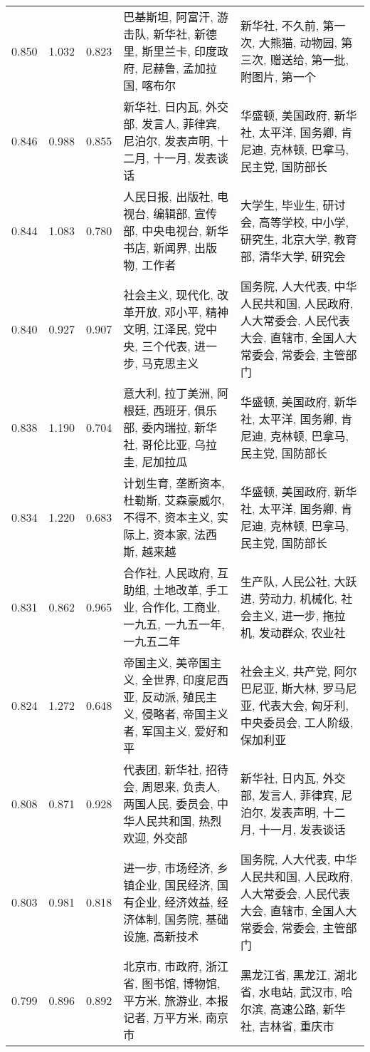 \begin{tabular}{cccp{5cm}p{5cm}}
0.850 & 1.032 & 0.823 & 巴基斯坦, 阿富汗, 游击队, 新华社, 新德里, 斯里兰卡, 印度政府, 尼赫鲁, 孟加拉国, 喀布尔 & 新华社, 不久前, 第一次, 大熊猫, 动物园, 第三次, 赠送给, 第一批, 附图片, 第一个 \\
0.846 & 0.988 & 0.855 & 新华社, 日内瓦, 外交部, 发言人, 菲律宾, 尼泊尔, 发表声明, 十二月, 十一月, 发表谈话 & 华盛顿, 美国政府, 新华社, 太平洋, 国务卿, 肯尼迪, 克林顿, 巴拿马, 民主党, 国防部长 \\
0.844 & 1.083 & 0.780 & 人民日报, 出版社, 电视台, 编辑部, 宣传部, 中央电视台, 新华书店, 新闻界, 出版物, 工作者 & 大学生, 毕业生, 研讨会, 高等学校, 中小学, 研究生, 北京大学, 教育部, 清华大学, 研究会 \\
0.840 & 0.927 & 0.907 & 社会主义, 现代化, 改革开放, 邓小平, 精神文明, 江泽民, 党中央, 三个代表, 进一步, 马克思主义 & 国务院, 人大代表, 中华人民共和国, 人民政府, 人大常委会, 人民代表大会, 直辖市, 全国人大常委会, 常委会, 主管部门 \\
0.838 & 1.190 & 0.704 & 意大利, 拉丁美洲, 阿根廷, 西班牙, 俱乐部, 委内瑞拉, 新华社, 哥伦比亚, 乌拉圭, 尼加拉瓜 & 华盛顿, 美国政府, 新华社, 太平洋, 国务卿, 肯尼迪, 克林顿, 巴拿马, 民主党, 国防部长 \\
0.834 & 1.220 & 0.683 & 计划生育, 垄断资本, 杜勒斯, 艾森豪威尔, 不得不, 资本主义, 实际上, 资本家, 法西斯, 越来越 & 华盛顿, 美国政府, 新华社, 太平洋, 国务卿, 肯尼迪, 克林顿, 巴拿马, 民主党, 国防部长 \\
0.831 & 0.862 & 0.965 & 合作社, 人民政府, 互助组, 土地改革, 手工业, 合作化, 工商业, 一九五, 一九五一年, 一九五二年 & 生产队, 人民公社, 大跃进, 劳动力, 机械化, 社会主义, 进一步, 拖拉机, 发动群众, 农业社 \\
0.824 & 1.272 & 0.648 & 帝国主义, 美帝国主义, 全世界, 印度尼西亚, 反动派, 殖民主义, 侵略者, 帝国主义者, 军国主义, 爱好和平 & 社会主义, 共产党, 阿尔巴尼亚, 斯大林, 罗马尼亚, 代表大会, 匈牙利, 中央委员会, 工人阶级, 保加利亚 \\
0.808 & 0.871 & 0.928 & 代表团, 新华社, 招待会, 周恩来, 负责人, 两国人民, 委员会, 中华人民共和国, 热烈欢迎, 外交部 & 新华社, 日内瓦, 外交部, 发言人, 菲律宾, 尼泊尔, 发表声明, 十二月, 十一月, 发表谈话 \\
0.803 & 0.981 & 0.818 & 进一步, 市场经济, 乡镇企业, 国民经济, 国有企业, 经济效益, 经济体制, 国务院, 基础设施, 高新技术 & 国务院, 人大代表, 中华人民共和国, 人民政府, 人大常委会, 人民代表大会, 直辖市, 全国人大常委会, 常委会, 主管部门 \\
0.799 & 0.896 & 0.892 & 北京市, 市政府, 浙江省, 图书馆, 博物馆, 平方米, 旅游业, 本报记者, 万平方米, 南京市 & 黑龙江省, 黑龙江, 湖北省, 水电站, 武汉市, 哈尔滨, 高速公路, 新华社, 吉林省, 重庆市 \\

\end{tabular}
